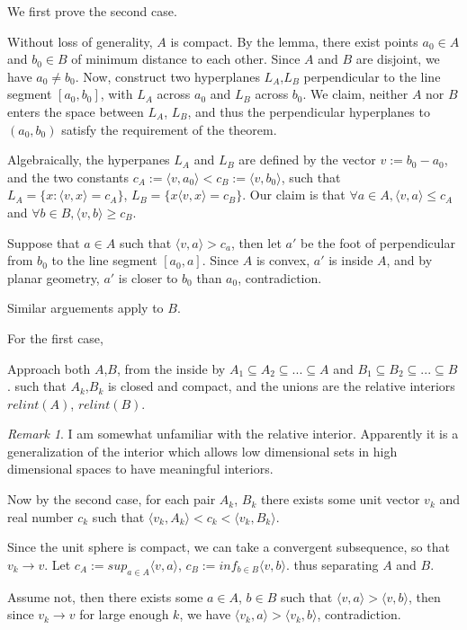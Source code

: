 \documentclass[11pt]{amsart}
\newcommand{\bracket}[1]{\langle #1 \rangle}
\theoremstyle{remark}
\newtheorem{rem}[thm]{Remark}
\theoremstyle{definition}
\begin{document}
\vspace{8pt}
\begin{mdframed}
    We first prove the second case.

    Without loss of generality, $A$ is compact. By the lemma,
    there exist points $a_0 \in A$ and $b_0 \in B$ of minimum
    distance to each other. Since $A$ and $B$ are disjoint,
    we have $a_0 \neq b_0$. Now, construct two hyperplanes
    $L_A$,$L_B$ perpendicular to the line segment $[a_0, b_0]$,
    with $L_A$ across $a_0$ and $L_B$ across $b_0$. We claim,
    neither $A$ nor $B$ enters the space between
    $L_A$, $L_B$, and thus the perpendicular hyperplanes to
    $(a_0, b_0)$ satisfy the requirement of the theorem.

    Algebraically, the hyperpanes $L_A$ and $L_B$ are defined by
    the vector $v := b_0 - a_0$, and the two constants
    $c_A := \bracket{v, a_0} < c_B := \bracket{v, b_0}$, such that
    $L_A = \{x : \bracket{v, x} = c_A \}$, $L_B = \{x \bracket{v, x} = c_B \}$.
    Our claim is that $\forall a \in A, \bracket{v, a} \le c_A$ and
    $\forall b \in B, \bracket{v, b} \ge c_B$.

    Suppose that $a \in A$ such that $\bracket{v, a} > c_a$, then
    let $a'$ be the foot of perpendicular from $b_0$ to the line
    segment $[a_0, a]$. Since $A$ is convex, $a'$ is inside $A$,
    and by planar geometry, $a'$ is closer to $b_0$ than $a_0$,
    contradiction.

    Similar arguements apply to $B$.

    \vspace{20pt}

    For the first case,

    Approach both $A$,$B$, from the inside by $A_1 \subseteq A_2 \subseteq ...
    \subseteq A$ and $B_1 \subseteq B_2 \subseteq ... \subseteq B$.
    such that $A_k$,$B_k$ is closed and compact, and the unions are the
    relative interiors $relint(A)$, $relint(B)$.

    \begin{mdframed}
        \begin{rem}
            I am somewhat unfamiliar with the relative interior. Apparently
            it is a generalization of the interior which allows low dimensional
            sets in high dimensional spaces to have meaningful interiors.
        \end{rem}
    \end{mdframed}

    Now by the second case, for each pair $A_k$, $B_k$ there
    exists some unit vector $v_k$ and real number $c_k$ such that
    $\bracket{v_k, A_k} < c_k < \bracket{v_k, B_k}$.

    Since the unit sphere is compact, we can take a convergent
    subsequence, so that $v_k \to v$. Let
    $c_A := {sup}_{a \in A}\bracket{v, a}$, $c_B :=
    {inf}_{b \in B}\bracket{v, b}$. thus separating $A$ and $B$.

    Assume not, then there exists some $a \in A$, $b \in B$
    such that $\bracket{v, a} > \bracket{v, b}$, then since
    $v_k \to v$ for large enough $k$, we have
    $\bracket{v_k, a} > \bracket{v_k, b}$, contradiction.

\end{mdframed}
\end{document}
